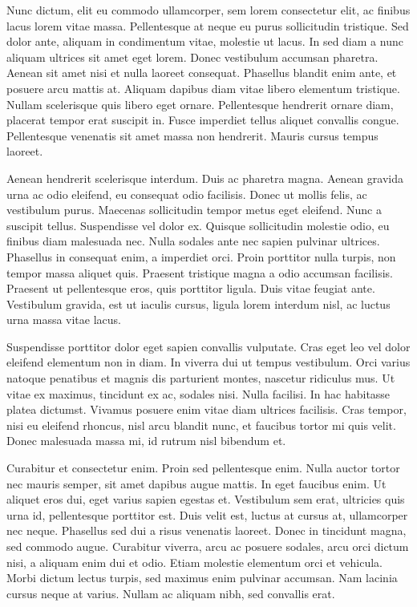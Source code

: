 Nunc dictum, elit eu commodo ullamcorper, sem lorem consectetur elit, ac finibus lacus lorem vitae massa. Pellentesque at neque eu purus sollicitudin tristique. Sed dolor ante, aliquam in condimentum vitae, molestie ut lacus. In sed diam a nunc aliquam ultrices sit amet eget lorem. Donec vestibulum accumsan pharetra. Aenean sit amet nisi et nulla laoreet consequat. Phasellus blandit enim ante, et posuere arcu mattis at. Aliquam dapibus diam vitae libero elementum tristique. Nullam scelerisque quis libero eget ornare. Pellentesque hendrerit ornare diam, placerat tempor erat suscipit in. Fusce imperdiet tellus aliquet convallis congue. Pellentesque venenatis sit amet massa non hendrerit. Mauris cursus tempus laoreet.

Aenean hendrerit scelerisque interdum. Duis ac pharetra magna. Aenean gravida urna ac odio eleifend, eu consequat odio facilisis. Donec ut mollis felis, ac vestibulum purus. Maecenas sollicitudin tempor metus eget eleifend. Nunc a suscipit tellus. Suspendisse vel dolor ex. Quisque sollicitudin molestie odio, eu finibus diam malesuada nec. Nulla sodales ante nec sapien pulvinar ultrices. Phasellus in consequat enim, a imperdiet orci. Proin porttitor nulla turpis, non tempor massa aliquet quis. Praesent tristique magna a odio accumsan facilisis. Praesent ut pellentesque eros, quis porttitor ligula. Duis vitae feugiat ante. Vestibulum gravida, est ut iaculis cursus, ligula lorem interdum nisl, ac luctus urna massa vitae lacus.

Suspendisse porttitor dolor eget sapien convallis vulputate. Cras eget leo vel dolor eleifend elementum non in diam. In viverra dui ut tempus vestibulum. Orci varius natoque penatibus et magnis dis parturient montes, nascetur ridiculus mus. Ut vitae ex maximus, tincidunt ex ac, sodales nisi. Nulla facilisi. In hac habitasse platea dictumst. Vivamus posuere enim vitae diam ultrices facilisis. Cras tempor, nisi eu eleifend rhoncus, nisl arcu blandit nunc, et faucibus tortor mi quis velit. Donec malesuada massa mi, id rutrum nisl bibendum et.

Curabitur et consectetur enim. Proin sed pellentesque enim. Nulla auctor tortor nec mauris semper, sit amet dapibus augue mattis. In eget faucibus enim. Ut aliquet eros dui, eget varius sapien egestas et. Vestibulum sem erat, ultricies quis urna id, pellentesque porttitor est. Duis velit est, luctus at cursus at, ullamcorper nec neque. Phasellus sed dui a risus venenatis laoreet. Donec in tincidunt magna, sed commodo augue. Curabitur viverra, arcu ac posuere sodales, arcu orci dictum nisi, a aliquam enim dui et odio. Etiam molestie elementum orci et vehicula. Morbi dictum lectus turpis, sed maximus enim pulvinar accumsan. Nam lacinia cursus neque at varius. Nullam ac aliquam nibh, sed convallis erat.

